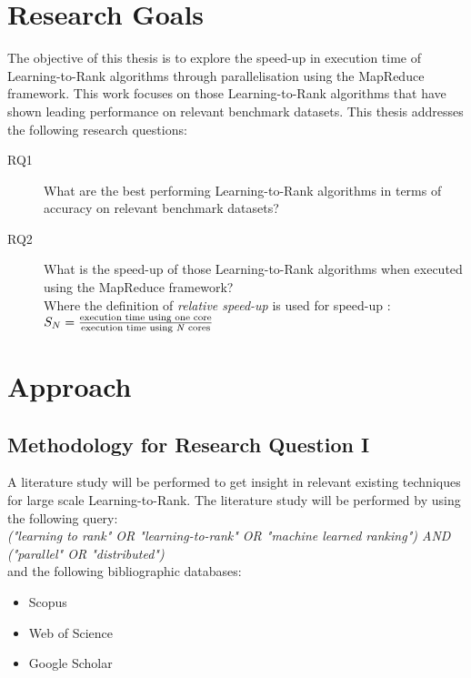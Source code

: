 \section{Research Goals}
\label{sec:goals}
The objective of this thesis is to explore the speed-up in execution time of Learning-to-Rank algorithms through parallelisation using the MapReduce framework.
This work focuses on those Learning-to-Rank algorithms that have shown leading performance on relevant benchmark datasets.
This thesis addresses the following research questions:
\begin{description}
\item[RQ1] What are the best performing Learning-to-Rank algorithms in terms of accuracy on relevant benchmark datasets?\\

\item[RQ2] What is the speed-up of those Learning-to-Rank algorithms when executed using the MapReduce framework?\\
Where the definition of \emph{relative speed-up} is used for speed-up \cite{Sun1991}:\\

$S_N = \frac{\text{execution time using one core}}{\text{execution time using \emph{N} cores}}$
\end{description}

\section{Approach}
\subsection{Methodology for Research Question I}
A literature study will be performed to get insight in relevant existing techniques for large scale Learning-to-Rank. The literature study will be performed by using the following query:\\

\emph{("learning to rank" \emph{OR} "learning-to-rank" \emph{OR} "machine learned ranking") \emph{AND} ("parallel" \emph{OR} "distributed")}\\

and the following bibliographic databases:
\begin{itemize}
\item Scopus
\item Web of Science
\item Google Scholar
\end{itemize}

